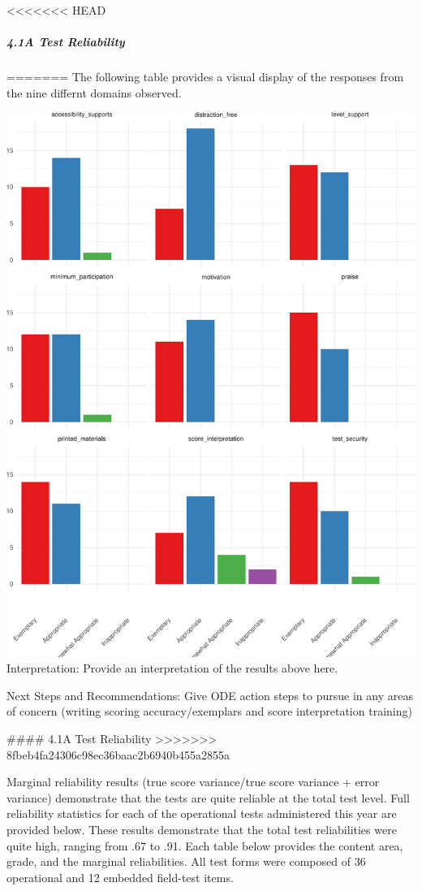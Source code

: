 \documentclass[]{article}
\let\oldsubparagraph\subparagraph
\renewcommand{\subparagraph}[1]{\oldsubparagraph{#1}\mbox{}}
\begin{document}
\clearpage
<<<<<<< HEAD
\FloatBarrier

\subparagraph{4.1A Test Reliability}\label{a-test-reliability}
=======
The following table provides a visual display of the responses from the
nine differnt domains observed.

\includegraphics{tech_report_18_files/figure-latex/unnamed-chunk-2-1.pdf}
Interpretation: Provide an interpretation of the results above here.

Next Steps and Recommendations: Give ODE action steps to pursue in any
areas of concern (writing scoring accuracy/exemplars and score
interpretation training)

\clearpage
\#\#\#\# 4.1A Test Reliability
>>>>>>> 8fbeb4fa24306c98ec36baac2b6940b455a2855a

Marginal reliability results (true score variance/true score variance +
error variance) demonstrate that the tests are quite reliable at the
total test level. Full reliability statistics for each of the
operational tests administered this year are provided below. These
results demonstrate that the total test reliabilities were quite high,
ranging from .67 to .91. Each table below provides the content area,
grade, and the marginal reliabilities. All test forms were composed of
36 operational and 12 embedded field-test items.
\end{document}
